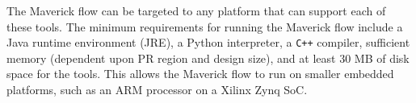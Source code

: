 The Maverick flow can be targeted to any platform that can support each of these tools. 
The minimum requirements for running the Maverick flow include a Java runtime environment (JRE), a Python interpreter, a {\tt C++} compiler, sufficient memory (dependent upon PR region and design size), and at least 30 MB of disk space for the tools.
This allows the Maverick flow to run on smaller embedded platforms, such as an ARM processor on a Xilinx Zynq SoC.
